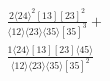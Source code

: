 \documentclass[varwidth, border=5pt]{standalone}
\begin{document}
\begin{my}
$\begin{gathered}
\scriptscriptstyle\frac{2⟨24⟩^2[13][23]^2}{⟨12⟩⟨23⟩⟨35⟩[35]^3}+\\
\scriptscriptstyle\frac{1⟨24⟩[13][23]⟨45⟩}{⟨12⟩⟨23⟩⟨35⟩[35]^2}\phantom{+}
\end{gathered}$
\end{my}
\end{document}
